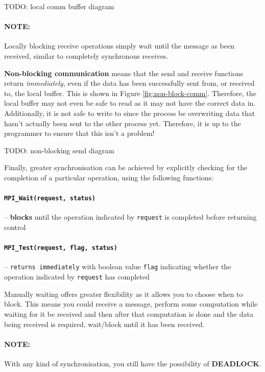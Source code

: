 \documentclass{article}
\begin{document}
TODO: local comm buffer diagram

\paragraph{\textbf{NOTE:}} Locally blocking receive operations simply wait until the message as been received, similar to completely synchronous receives.

\textbf{Non-blocking communication} means that the send and receive functions return \textit{immediately}, even if the data has been successfully sent from, or received to, the local buffer. This is shown in Figure \ref{fig:non-block-comm}. Therefore, the local buffer may not even be safe to read as it may not have the correct data in. Additionally, it is not safe to write to since the process be overwriting data that hasn't actually been sent to the other process yet. Therefore, it is up to the programmer to ensure that this isn't a problem!

TODO: non-blocking send diagram

Finally, greater synchronisation can be achieved by explicitly checking for the completion of a particular operation, using the following functions:
\paragraph{ \texttt{MPI\_Wait(request, status)}} -- \textbf{blocks} until the operation indicated by \texttt{request} is completed before returning control
\paragraph{ \texttt{MPI\_Test(request, flag, status)}} -- \texttt{returns immediately} with boolean value \texttt{flag} indicating whether the operation indicated by \texttt{request} has completed

Manually waiting offers greater flexibility as it allows you to choose when to block. This means you could receive a message, perform some computation  while waiting for it be received and then after that computation is done and the data being received is required, wait/block until it has been received.

\paragraph{\textbf{NOTE}:} With any kind of synchronisation, you still have the possibility of \textbf{DEADLOCK}.
\end{document}
